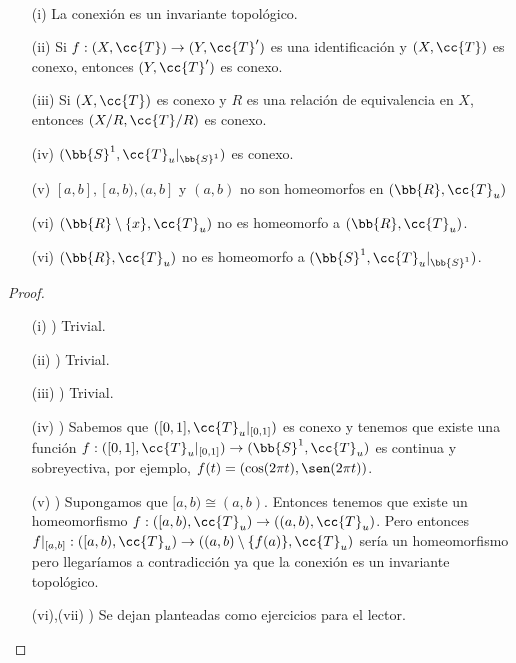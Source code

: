 \begin{coro}\
    \begin{enumerate}
        \item[(i)] La conexión es un invariante topológico.
        \item[(ii)] Si $f:(X, \cc{T})\to (Y, \cc{T}')$ es una identificación y $(X, \cc{T})$ es conexo, entonces $(Y, \cc{T}')$ es conexo.
        \item[(iii)] Si $(X, \cc{T})$ es conexo y $R$ es una relación de equivalencia en $X$, entonces $(X/R, \cc{T}/R)$ es conexo.
        \item[(iv)] $(\bb{S}^1, \cc{T}_u|_{\bb{S}^1})$ es conexo.
        \item[(v)] $[a,b], [a,b), (a,b]$ y $(a,b)$ no son homeomorfos en $(\bb{R}, \cc{T}_u)$ 
        \item[(vi)] $(\bb{R}\setminus \{x\}, \cc{T}_u)$ no es homeomorfo a $(\bb{R}, \cc{T}_u)$.
        \item[(vi)] $(\bb{R}, \cc{T}_u)$ no es homeomorfo a $(\bb{S}^1, \cc{T}_u|_{\bb{S}^1})$.  
    \end{enumerate}
    \begin{proof}\
        \begin{enumerate}
            \item[(i) )] Trivial.
            \item[(ii) )] Trivial.
            \item[(iii) )] Trivial.
            \item[(iv) )] Sabemos que $([0,1], \cc{T}_u|_{[0,1]})$ es conexo y tenemos que existe una función $f:([0,1], \cc{T}_u|_{[0,1]})\to (\bb{S}^1, \cc{T}_u)$ es continua y sobreyectiva, por ejemplo, $f(t)=(\cos(2\pi t), \sen(2\pi t))$.
            \item[(v) )] Supongamos que $[a,b)\cong(a,b)$. Entonces tenemos que existe un homeomorfismo $f:([a,b), \cc{T}_u)\to ((a,b), \cc{T}_u)$. Pero entonces $f|_{[a,b]}:([a,b), \cc{T}_u)\to ((a,b)\setminus \{f(a)\}, \cc{T}_u)$ sería un homeomorfismo pero llegaríamos a contradicción ya que la conexión es un invariante topológico.
            \item[(vi),(vii) )] Se dejan planteadas como ejercicios para el lector.  
        \end{enumerate}
    \end{proof}
\end{coro}

